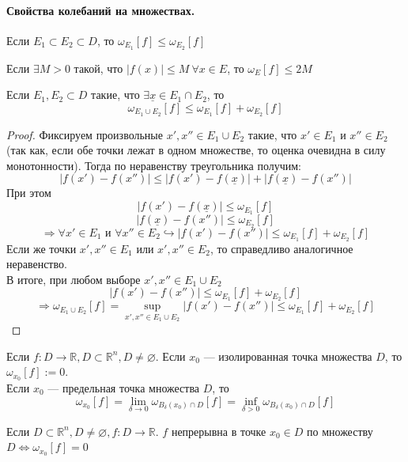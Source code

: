 \documentclass[11pt]{article}
\begin{document}
\paragraph{Свойства колебаний на множествах.}
\begin{lemma}
    Если $E_1 \subset E_2 \subset D$, то $\omega_{E_1} [f] \leq \omega_{E_2}[f]$
\end{lemma}
\begin{lemma}
    Если $\exists M>0$ такой, что $|f(x)|\leq M \ \forall x\in E$, то $\omega_E [f]\leq 2M$
\end{lemma}
\begin{lemma}
    Если $E_1, E_2 \subset D$ такие, что $\exists \underline{x} \in E_1\cap E_2$, то 
    \[ \omega_{E_1\cup E_2} [f] \leq \omega_{E_1} [f] + \omega_{E_2} [f] \]
\end{lemma}


\begin{proof}
    Фиксируем произвольные $x',x'' \in E_1\cup E_2$ такие, что $x'\in E_1$ и $x''\in E_2$ (так как, если обе точки лежат в одном множестве, то оценка очевидна в силу монотонности).
    Тогда по неравенству треугольника получим:
    \[ |f(x')-f(x'')| \leq |f(x')-f(\underline{x})| + |f(\underline{x})-f(x'')| \]
    При этом 
    \[ |f(x')-f(\underline{x})| \leq \omega_{E_1} [f]\]   
    \[ |f(\underline{x})-f(x'')|\leq \omega_{E_2} [f] \]
    \[ \Rightarrow \forall x'\in E_1 \text{ и } \forall x''\in E_2 \hookrightarrow |f(x')-f(x'')| \leq \omega_{E_1}[f] + \omega_{E_2} [f] \]  
    Если же точки $x',x''\in E_1$ или $x',x''\in E_2$, то справедливо аналогичное неравенство.\\
    В итоге, при любом выборе $x',x''\in E_1\cup E_2$
    \[ |f(x')-f(x'')| \leq \omega_{E_1} [f] + \omega_{E_2}[f] \]
    \[ \Rightarrow \omega_{E_1\cup E_2}[f]= \sup_{x',x''\in E_1\cup E_2} |f(x')-f(x'')| \leq \omega_{E_1}[f] +\omega_{E_2}[f] \] 
\end{proof}


\begin{definition}
    Если $f: D\to \mathbb{R}, D\subset \mathbb{R}^n, D\neq \varnothing$. Если $x_0$ --- изолированная точка множества $D$, то $\omega_{x_0}[f] := 0$.\\ 
    Если $x_0$ --- предельная точка множества $D$, то 
    \[ \omega_{x_0} [f] = \lim\limits_{\delta \to 0} \omega_{B_\delta (x_0) \cap D} [f] = \inf_{\delta>0} \omega_{B_\delta(x_0)\cap D}[f] \]
\end{definition}

\begin{theorem}
    Если $D\subset \mathbb{R}^n , D\neq \varnothing, f: D\to \mathbb{R}$. $f$ непрерывна в точке $x_0\in D$ по множеству $D \Leftrightarrow \omega_{x_0} [f] =0 $

\end{theorem}
\end{document}
